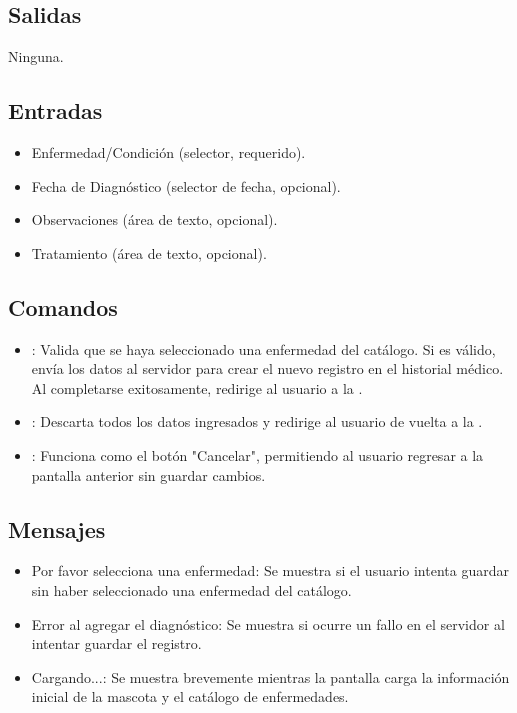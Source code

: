 \subsection{Salidas}
    Ninguna.

\subsection{Entradas}
\begin{itemize}
    \item Enfermedad/Condición (selector, requerido).
    \item Fecha de Diagnóstico (selector de fecha, opcional).
    \item Observaciones (área de texto, opcional).
    \item Tratamiento (área de texto, opcional).
\end{itemize}

\subsection{Comandos}
\begin{itemize}
    \item {}: Valida que se haya seleccionado una enfermedad del catálogo. Si es válido, envía los datos al servidor para crear el nuevo registro en el historial médico. Al completarse exitosamente, redirige al usuario a la .
    \item {}: Descarta todos los datos ingresados y redirige al usuario de vuelta a la .
    \item {}: Funciona como el botón "Cancelar", permitiendo al usuario regresar a la pantalla anterior sin guardar cambios.
\end{itemize}

\subsection{Mensajes}
\begin{itemize}
    \item Por favor selecciona una enfermedad: Se muestra si el usuario intenta guardar sin haber seleccionado una enfermedad del catálogo.
    \item Error al agregar el diagnóstico: Se muestra si ocurre un fallo en el servidor al intentar guardar el registro.
    \item Cargando...: Se muestra brevemente mientras la pantalla carga la información inicial de la mascota y el catálogo de enfermedades.
\end{itemize}
